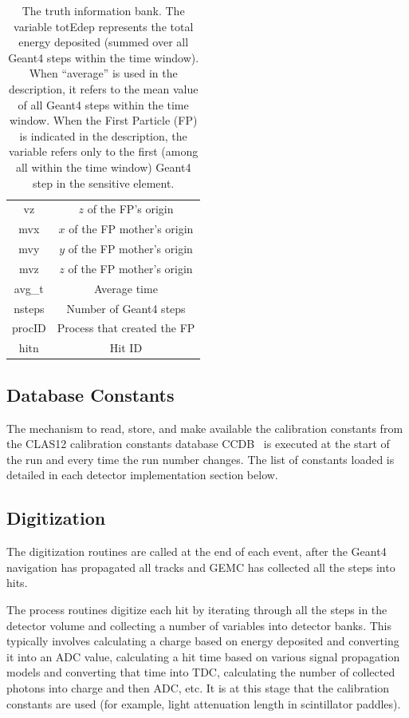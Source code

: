 \begin{table}[h]
\begin{center}
\begin{tabular}{| c | c |}
				vz          &   $z$  of the FP's origin \\
				mvx         &   $x$  of the FP mother's origin\\
				mvy         &   $y$  of the FP mother's origin \\
				mvz         &   $z$  of the FP mother's origin \\
				avg\_t      &   Average time \\
				nsteps      &   Number of Geant4 steps \\
				procID      &   Process that created the FP  \\
				hitn        &   Hit ID \\
			\hline \hline
		\end{tabular}
	\end{center}
	\caption{The truth information bank. The variable totEdep represents the total energy deposited (summed over all
          Geant4 steps within the time window). When ``average'' is used in the description, it refers to the mean value
          of all Geant4 steps within the time window. When the First Particle (FP) is indicated in the description, the variable
          refers only to the first (among all within the time window) Geant4 step in the sensitive element.}
        \label{tab:trueInformation}
\end{table}

\subsection{Database Constants}

The mechanism to read, store, and make available the calibration constants from the CLAS12 calibration constants
database CCDB~\cite{ccdb} is executed at the start of the run and every time the run number changes. The list of
constants loaded is detailed in each detector implementation section below.

\subsection{Digitization}

The digitization routines are called at the end of each event, after the Geant4 navigation has propagated all tracks
and GEMC has collected all the steps into hits.

The process routines digitize each hit by iterating through all the steps in the detector volume and collecting
a number of variables into detector banks. This typically involves calculating a charge based on energy deposited
and converting it into an ADC value, calculating a hit time based on various signal propagation models and converting
that time into TDC, calculating the number of collected photons into charge and then ADC, etc. It is at this stage that
the calibration constants are used (for example, light attenuation length in scintillator paddles).

